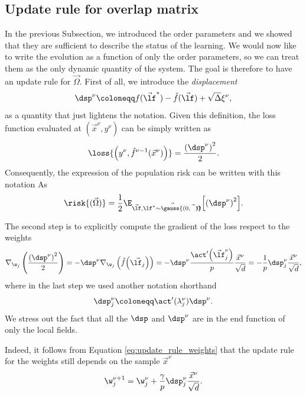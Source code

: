\subsection{Update rule for overlap matrix} \label{subsec:updateruleforoverlap}
In the previous Subsection, we introduced the order parameters and we showed that 
they are sufficient to describe the status of the learning. We would now like
to write the evolution as a function of only the order parameters,
so we can treat them as the only dynamic quantity of the system.
The goal is therefore to have an update rule for \(\vec{\Omega}\).
First of all, we introduce the \emph{displacement}
\[
  \dsp^\nu \coloneqq f{(\vec{\lf}^*)} - \hat{f}{(\vec{\lf})} + \sqrt{\Delta} \xi^\nu,
\]
as a quantity that just lightens the notation.
Given this definition, the loss function evaluated at \((\vec{x}^\nu,y^\nu)\)
can be simply written as
\[\loss{\left(y^\nu,\hat{f}^{\nu-1}{\left(\vec{x}^\nu\right)}\right)} = \frac{\left(\dsp^\nu\right)^2}{2}.\]
Consequently, the expression of the population risk can be written with this notation As
\begin{equation}\label{eq:risk_lambda_expval}
  \risk{(\vec{\Omega})} = \frac12\E_{\vec{\lf},\vec{\lf^* \sim \gauss{(0,\vec{\Omega})}}}
                              {\left[\left(\dsp^\nu\right)^2\right]}.
\end{equation}

The second step is to explicitly compute the gradient of the loss respect to the weights
\[
  \nabla_{\w_j}\left(\frac{\left(\dsp^\nu\right)^2}{2}\right) =
    -\dsp^\nu \nabla_{\w_j}\left(\hat{f}{\left(\vec{\lf_j}\right)}\right) =
    -\dsp^\nu \frac{\act'{\left(\vec{\lf}^\nu_j\right)}}{p}\frac{\vec{x}^\nu}{\sqrt{d}} =
    -\frac{1}{p}\dsp^\nu_j \frac{\vec{x}^\nu}{\sqrt{d}},
\]
where in the last step we used another notation shorthand
\[
  \dsp^\nu_j \coloneqq \act'{(\lambda_j^\nu)} \dsp^\nu.
\]
We stress out the fact that all the \(\dsp\) and \(\dsp^\nu\) are in the end function of only
the local fields.

Indeed, it follows from Equation \eqref{eq:update_rule_weights} that the update rule
for the weights still depends on the sample \(\vec{x}^\nu\)
\[
  \w^{\nu+1}_j = \w^{\nu}_j + \frac{\gamma}{p} \dsp^\nu_j \frac{\vec{x}^\nu}{\sqrt{d}}.
\]

